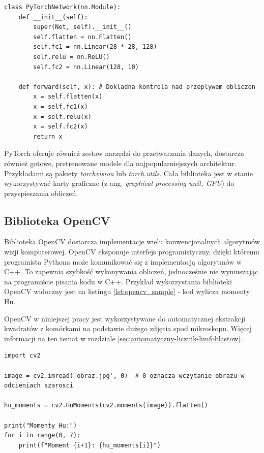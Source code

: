 \begin{lstlisting}[language=ipython,caption={Przykładowa sieć neuronowa w PyTorch},label={lst:pytorch_sample}]
class PyTorchNetwork(nn.Module):
    def __init__(self):
        super(Net, self).__init__()
        self.flatten = nn.Flatten()
        self.fc1 = nn.Linear(28 * 28, 128)
        self.relu = nn.ReLU()
        self.fc2 = nn.Linear(128, 10)

    def forward(self, x): # Dokladna kontrola nad przeplywem obliczen
        x = self.flatten(x)
        x = self.fc1(x)
        x = self.relu(x)
        x = self.fc2(x)
        return x
\end{lstlisting}

PyTorch oferuje również zestaw narzędzi do przetwarzania danych, dostarcza również gotowe, pretrenowane modele dla najpopularniejszych architektur.
Przykładami są pakiety \textit{torchvision} lub \textit{torch.utils}. Cała biblioteka jest w stanie wykorzystywać karty graficzne (z ang. \textit{graphical processing unit, GPU}) do przyspieszania obliczeń.

\subsection{Biblioteka OpenCV}

Biblioteka OpenCV \cite{opencv} dostarcza implementacje wielu konwencjonalnych algorytmów wizji komputerowej.
OpenCV eksponuje interfejs programistyczny, dzięki któremu programista Pythona może komunikować się z implementacją algorytmów w C++.
To zapewnia szybkość wykonywania obliczeń, jednocześnie nie wymuszając na programiście pisania kodu w C++. Przykład wykorzystania biblioteki OpenCV widoczny jest na listingu \ref{lst:opencv_sample}
- kod wylicza momenty Hu.

OpenCV w niniejszej pracy jest wykorzystywane do automatycznej ekstrakcji kwadratów z komórkami na podstawie dużego zdjęcia spod mikroskopu.
Więcej informacji na ten temat w rozdziale \ref{sec:automatyczny-licznik-limfoblastow}.

\begin{lstlisting}[language=ipython,caption={Obliczenie momentów Hu z użyciem OpenCV}, label={lst:opencv_sample}]
import cv2

image = cv2.imread('obraz.jpg', 0)  # 0 oznacza wczytanie obrazu w odcieniach szarosci

hu_moments = cv2.HuMoments(cv2.moments(image)).flatten()

print("Momenty Hu:")
for i in range(0, 7):
    print(f"Moment {i+1}: {hu_moments[i]}")
\end{lstlisting}


